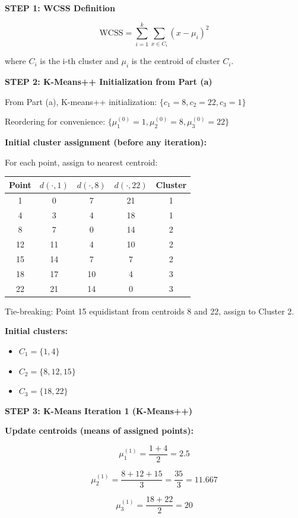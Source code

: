 \documentclass[12pt]{article}
\begin{document}
\begin{solution}
\textbf{STEP 1: WCSS Definition}

\[
\text{WCSS} = \sum_{i=1}^k \sum_{x \in C_i} (x - \mu_i)^2
\]

where $C_i$ is the i-th cluster and $\mu_i$ is the centroid of cluster $C_i$.

\textbf{STEP 2: K-Means++ Initialization from Part (a)}

From Part (a), K-means++ initialization: $\{c_1=8, c_2=22, c_3=1\}$

Reordering for convenience: $\{\mu_1^{(0)}=1, \mu_2^{(0)}=8, \mu_3^{(0)}=22\}$

\textbf{Initial cluster assignment (before any iteration):}

For each point, assign to nearest centroid:

\begin{center}
\begin{tabular}{c|c|c|c|c}
Point & $d(\cdot, 1)$ & $d(\cdot, 8)$ & $d(\cdot, 22)$ & Cluster \\
\hline
1 & 0 & 7 & 21 & 1 \\
4 & 3 & 4 & 18 & 1 \\
8 & 7 & 0 & 14 & 2 \\
12 & 11 & 4 & 10 & 2 \\
15 & 14 & 7 & 7 & 2 \\
18 & 17 & 10 & 4 & 3 \\
22 & 21 & 14 & 0 & 3 \\
\end{tabular}
\end{center}

Tie-breaking: Point 15 equidistant from centroids 8 and 22, assign to Cluster 2.

\textbf{Initial clusters:}
\begin{itemize}
    \item $C_1 = \{1, 4\}$
    \item $C_2 = \{8, 12, 15\}$
    \item $C_3 = \{18, 22\}$
\end{itemize}

\textbf{STEP 3: K-Means Iteration 1 (K-Means++)}

\textbf{Update centroids (means of assigned points):}

\[
\mu_1^{(1)} = \frac{1 + 4}{2} = 2.5
\]

\[
\mu_2^{(1)} = \frac{8 + 12 + 15}{3} = \frac{35}{3} = 11.667
\]

\[
\mu_3^{(1)} = \frac{18 + 22}{2} = 20
\]


\end{solution}
\end{document}
